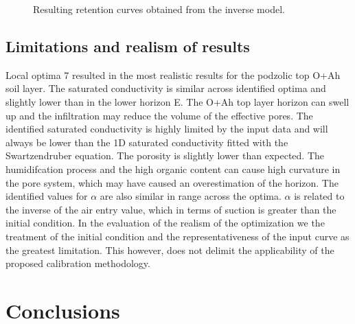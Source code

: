 \documentclass[review,times,3p,twocolumn,10pt]{elsarticle}
\begin{document}
\begin{figure}
\centering
{}
\caption{Resulting retention curves obtained from the inverse model.}
\label{retc-final}
\end{figure}


\subsection{Limitations and realism of results}


Local optima 7 resulted in the most realistic results for the podzolic top O+Ah soil layer. The saturated conductivity is similar across identified optima and slightly lower than in the lower horizon E. The O+Ah top layer horizon can swell up and the infiltration may reduce the volume of the effective pores. The identified saturated conductivity is highly limited by the input data and will always be lower than the 1D saturated conductivity fitted with the Swartzendruber equation. The porosity is slightly lower than expected. The humidifcation process and the high organic content can cause high curvature in the pore system, which may have caused an overestimation of the horizon.  The identified values for $\alpha$ are also similar in range across the optima. $\alpha$ is related to the inverse of the air entry value, which in terms of suction is greater than the initial condition. 
In the evaluation of the realism of the optimization we the treatment of the initial condition and the representativeness of the input curve as the greatest limitation. This however, does not delimit the applicability of the proposed calibration methodology. 

 

\section{Conclusions}
\end{document}
